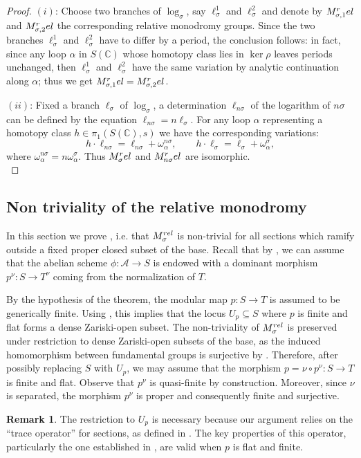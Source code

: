 \documentclass[10 pt,a4paper]{article}
\theoremstyle{plain}
\theoremstyle{definition}
\newtheorem{rem}[thm]{Remark}
\theoremstyle{named}
\newcommand{\cA}{\mathcal A}
\newcommand{\bC}{\mathbb C}
\begin{document}
\begin{proof}
	$(i)$: Choose two branches of $\log_\sigma$, say $\ell_\sigma^1$ and $\ell_\sigma^2$ and denote by $M_{\sigma,1}^\textnormal{rel}$ and $M_{\sigma,2}^\textnormal{rel}$ the corresponding relative monodromy groups. Since the two branches $\ell_\sigma^1$ and $\ell_\sigma^2$ have to differ by a period, the conclusion follows: in fact, since any loop $\alpha$ in $S(\bC)$ whose homotopy class lies in $\ker{\rho}$ leaves periods unchanged, then $\ell_\sigma^1$ and $\ell_\sigma^2$ have the same variation by analytic continuation along $\alpha$; thus we get $M_{\sigma,1}^\textnormal{rel}=M_{\sigma,2}^\textnormal{rel}$.
	
	$(ii)$: Fixed a branch $\ell_\sigma$ of $\log_\sigma$, a determination $\ell_{n\sigma}$ of the logarithm of $n\sigma$ can be defined by the equation $ \ell_{n\sigma}=n\ell_\sigma$. For any loop $\alpha$ representing a homotopy class $h \in \pi_1(S(\bC),s)$ we have the corresponding variations:
	\[
	h\cdot \ell_{n\sigma}=\ell_{n\sigma}+\omega_\alpha^{n\sigma}, \qquad  h\cdot \ell_\sigma = \ell_\sigma+\omega_\alpha^\sigma,
	\]
	where $\omega_\alpha^{n\sigma}=n\omega_\alpha^\sigma$. Thus $M_\sigma^\textnormal{rel}$ and $M_{n\sigma}^\textnormal{rel}$ are isomorphic.\\
\end{proof}

\subsection{Non triviality of the relative monodromy}\label{section:3.2}

In this section we prove , i.e. that $M_{\sigma}^{\textnormal{rel}}$ is non-trivial for all sections which ramify outside a fixed proper closed subset of the base. Recall that by  , we can assume that the abelian scheme $\phi:\cA \to S$ is endowed with a dominant morphism $p^\nu:S \to T^\nu$ coming from the normalization of $T$.

By the hypothesis of the theorem, the modular map $p \colon S \to T$ is assumed to be generically finite. Using \cite[Lemma 10.5]{Hart}, this implies that the locus $U_p \subseteq S$ where $p$ is finite and flat forms a dense Zariski-open subset. The non-triviality of $M_{\sigma}^{\textnormal{rel}}$ is preserved under restriction to dense Zariski-open subsets of the base, as the induced homomorphism between fundamental groups is surjective by \cite[Proposition 2.10]{kol}.  Therefore, after possibly replacing $S$ with $U_p$, we may assume that the morphism $p = \nu \circ p^\nu \colon S \to T$ is finite and flat. Observe that $p^\nu$ is quasi-finite by construction. Moreover, since $\nu$ is separated, the morphism $p^\nu$ is proper and consequently finite and surjective.
\begin{rem}\label{rem:case_ell}
    The restriction to $U_p$ is necessary because our argument relies on the ``trace operator'' for sections, as defined in . The key properties of this operator, particularly the one established in , are valid when $p$ is flat and finite.
\end{rem}
\end{document}
